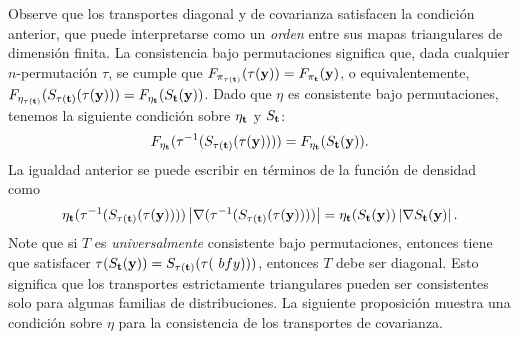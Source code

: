Observe que los transportes diagonal y de covarianza satisfacen la condición anterior, que puede interpretarse como un \emph{orden} entre sus mapas triangulares de dimensión finita. La consistencia bajo permutaciones significa que, dada cualquier \(n\)-permutación \(\tau\), se cumple que \(F_{\pi_{\tau(\mathbf{t})}}(\tau(\mathbf{y})) = F_{\pi_{\mathbf{t}}}(\mathbf{y})\), o equivalentemente, \(F_{\eta_{\tau(\mathbf{t})}}(S_{\tau(\mathbf{t})}(\tau(\mathbf{y}))) = F_{\eta_{\mathbf{t}}}(S_{\mathbf{t}}(\mathbf{y}))\). Dado que \(\eta\) es consistente bajo permutaciones, tenemos la siguiente condición sobre \(\eta_{\mathbf{t}}\) y \(S_{\mathbf{t}}\):
\begin{align}
F_{\eta_{\mathbf{t}}}(\tau^{-1}(S_{\tau(\mathbf{t})}(\tau(\mathbf{y})))) = F_{\eta_{\mathbf{t}}}(S_{\mathbf{t}}(\mathbf{y})).
\end{align}
La igualdad anterior se puede escribir en términos de la función de densidad como
\begin{align}
\eta_{\mathbf{t}}(\tau^{-1}(S_{\tau(\mathbf{t})}(\tau(\mathbf{y})))) \left\vert \nabla( \tau^{-1}(S_{\tau(\mathbf{t})}(\tau(\mathbf{y})))) \right\vert = \eta_{\mathbf{t}}(S_{\mathbf{t}}(\mathbf{y})) \left\vert \nabla S_{\mathbf{t}}(\mathbf{y}) \right\vert.
\end{align}
Note que si \(T\) es \emph{universalmente} consistente bajo permutaciones, entonces tiene que satisfacer \(\tau(S_{\mathbf{t}}(\mathbf{y})) = S_{\tau(\mathbf{t})}(\tau(\ bfy)))\), entonces \(T\) debe ser diagonal. Esto significa que los transportes estrictamente triangulares pueden ser consistentes solo para algunas familias de distribuciones. La siguiente proposición muestra una condición sobre \(\eta\) para la consistencia de los transportes de covarianza.

